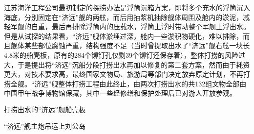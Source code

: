\documentclass[12pt,UTF8]{ctexbook}
\begin{document}
江苏海洋工程公司最初制定的探捞办法是浮筒沉箱方案，即将多个充水的浮筒沉入海底，分别固定在“济远”舰的两舷，而后用抽浆机抽除舰体周围及舱内的淤泥，减轻军舰的自重，最后再排除浮筒内的压载水，浮筒上浮时带动整个军舰上浮出水。但是从试探的结果看，“济远”舰体淤埋过深，舱内一些淤积物硬化，难以排除，而且舰体某些部位腐蚀严重，结构强度不足（当时曾提取出水了“济远”舰右舷一块长4.8米的船壳板，原有的284个铆钉孔仅剩39个铆钉还保存着），整体打捞的风险过大，于是提出将“济远”沉船分段打捞出水再加以修复的第二套方案，然而由于耗资更大，对技术要求高，最终国家文物局、旅游局等部门决定放弃原定计划，不再打捞全舰。“济远”舰整体打捞工程由此终止，由两次打捞出水的共132组文物全部由中国甲午战争博物馆保藏，其中一些经修缮和保护处理后已对游人开放参观。

打捞出水的“济远”舰船壳板

“济远”舰主炮吊运上刘公岛
\end{document}
